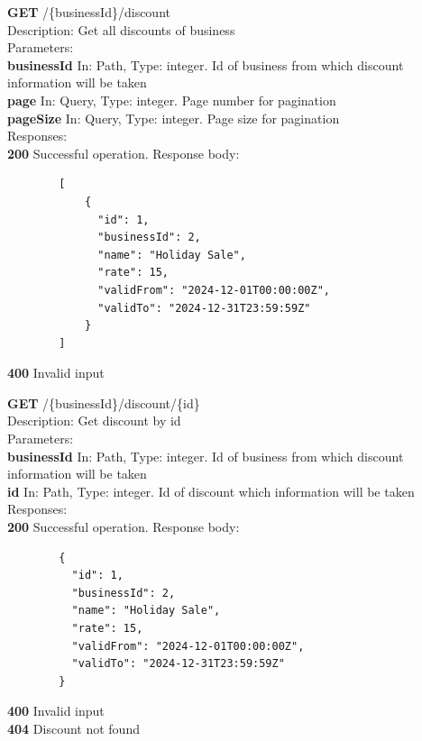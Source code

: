 \documentclass[11pt,a4paper,pdftex]{article}
\begin{document}
\hspace*{1em}\textbf{GET} /\{businessId\}/discount\\
\hspace*{2em}Description: Get all discounts of business\\
\hspace*{2em}Parameters:\\
\hspace*{3em}\textbf{businessId} In: Path, Type: integer. Id of business from which discount information will be taken\\
\hspace*{3em}\textbf{page} In: Query, Type: integer. Page number for pagination\\
\hspace*{3em}\textbf{pageSize} In: Query, Type: integer. Page size for pagination\\
\hspace*{2em}Responses:\\
\hspace*{3em}\textbf{200} Successful operation. Response body:
\begin{verbatim}
        [
            {
              "id": 1,
              "businessId": 2,
              "name": "Holiday Sale",
              "rate": 15,
              "validFrom": "2024-12-01T00:00:00Z",
              "validTo": "2024-12-31T23:59:59Z"
            }
        ]
\end{verbatim}
\hspace*{3em}\textbf{400} Invalid input

\hspace*{1em}\textbf{GET} /\{businessId\}/discount/\{id\}\\
\hspace*{2em}Description: Get discount by id\\
\hspace*{2em}Parameters:\\
\hspace*{3em}\textbf{businessId} In: Path, Type: integer. Id of business from which discount information will be taken\\
\hspace*{3em}\textbf{id} In: Path, Type: integer. Id of discount which information will be taken\\
\hspace*{2em}Responses:\\
\hspace*{3em}\textbf{200} Successful operation. Response body:
\begin{verbatim}
        {
          "id": 1,
          "businessId": 2,
          "name": "Holiday Sale",
          "rate": 15,
          "validFrom": "2024-12-01T00:00:00Z",
          "validTo": "2024-12-31T23:59:59Z"
        }
\end{verbatim}
\hspace*{3em}\textbf{400} Invalid input\\
\hspace*{3em}\textbf{404} Discount not found
\end{document}
